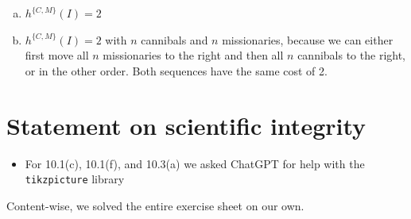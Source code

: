 \documentclass{article} %
\begin{document}
\begin{enumerate}[(a)]
\begin{itemize}
        \item $h^{\{C, M\}}(\{ \langle 1, 0, L \rangle, \langle 1, 0, R \rangle \}) = 1$
        \item $h^{\{C, M\}}(\{ \langle 0, 1, L \rangle, \langle 0, 1, R \rangle \}) = \infty$
        \item $h^{\{C, M\}}(\{ \langle 2, 0, L \rangle, \langle 2, 0, R \rangle \}) = 1$
        \item $h^{\{C, M\}}(\{ \langle 1, 1, L \rangle, \langle 1, 1, R \rangle \}) = 1$
        \item $h^{\{C, M\}}(\{ \langle 0, 2, L \rangle, \langle 0, 2, R \rangle \}) = 1$
        \item $h^{\{C, M\}}(\{ \langle 2, 1, L \rangle, \langle 2, 1, R \rangle \}) = \infty$
        \item $h^{\{C, M\}}(\{ \langle 1, 2, L \rangle, \langle 1, 2, R \rangle \}) = 2$
        \item $h^{\{C, M\}}(\{ \langle 2, 2, L \rangle, \langle 2, 2, R \rangle \}) = 2$
    \end{itemize}
    \item $h^{\{C, M\}}(I) = 2$
    \item $h^{\{C, M\}}(I) = 2$ with $n$ cannibals and $n$ missionaries, because
    we can either first move all $n$ missionaries to the right and then all $n$
    cannibals to the right, or in the other order. Both sequences have the same
    cost of 2.
\end{enumerate}


\section*{Statement on scientific integrity}
\begin{itemize}
    \item For 10.1(c), 10.1(f), and 10.3(a) we asked ChatGPT for help with the \texttt{tikzpicture} library
\end{itemize}
Content-wise, we solved the entire exercise sheet on our own.
\end{document}
